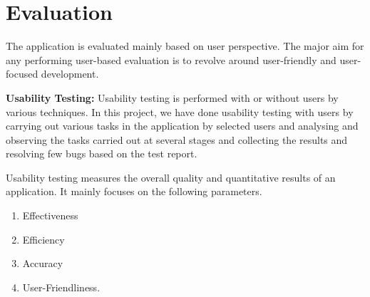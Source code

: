 \chapter{Evaluation}

The application is evaluated mainly based on user perspective.
The major aim for any performing user-based evaluation is to revolve around user-friendly and user-focused development\cite{Riihiaho_2018}. 

\textbf{Usability Testing: }\newline
Usability testing is performed with or without users by various techniques. In this project, we have done usability testing with users by carrying out various tasks in the application by selected users and analysing and observing the tasks carried out at several stages and collecting the results and resolving few bugs based on the test report\cite{Riihiaho_2018}.

Usability testing measures the overall quality and quantitative results of an application. It mainly focuses on the following parameters.
\begin{enumerate}
    \item Effectiveness
    \item Efficiency
    \item Accuracy
    \item User-Friendliness\cite{hamilton_2021}.
\end{enumerate}

